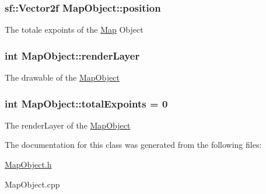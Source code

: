 \subsubsection[{position}]{\setlength{\rightskip}{0pt plus 5cm}sf\+::\+Vector2f Map\+Object\+::position\hspace{0.3cm}{\ttfamily [protected]}}\label{class_map_object_a00491cbf8e4cbc729ef37e11f3473860}
The totale expoints of the \hyperlink{class_map}{Map} Object \hypertarget{class_map_object_ac7431860a4ca955dc3db173926be3856}{}
\subsubsection[{render\+Layer}]{\setlength{\rightskip}{0pt plus 5cm}int Map\+Object\+::render\+Layer\hspace{0.3cm}{\ttfamily [protected]}}\label{class_map_object_ac7431860a4ca955dc3db173926be3856}
The drawable of the \hyperlink{class_map_object}{Map\+Object} \hypertarget{class_map_object_a93598b361b5c86637ae5779146e222da}{}
\subsubsection[{total\+Expoints}]{\setlength{\rightskip}{0pt plus 5cm}int Map\+Object\+::total\+Expoints = 0\hspace{0.3cm}{\ttfamily [protected]}}\label{class_map_object_a93598b361b5c86637ae5779146e222da}
The render\+Layer of the \hyperlink{class_map_object}{Map\+Object} 

The documentation for this class was generated from the following files\+:\begin{DoxyCompactItemize}
\item 
\hyperlink{_map_object_8h}{Map\+Object.\+h}\item 
Map\+Object.\+cpp\end{DoxyCompactItemize}

